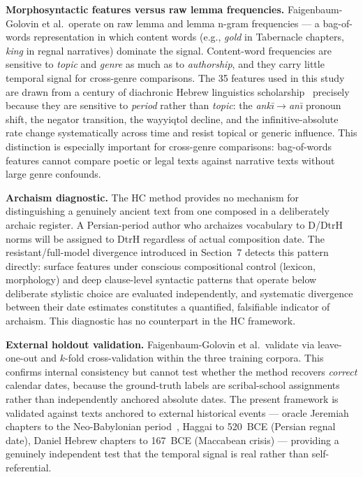 \documentclass[10pt,letterpaper]{article}
\begin{document}
\textbf{Morphosyntactic features versus raw lemma frequencies.}
Faigenbaum-Golovin et al.\ operate on raw lemma and lemma n-gram
frequencies --- a bag-of-words representation in which content words
(e.g., \textit{gold} in Tabernacle chapters, \textit{king} in regnal
narratives) dominate the signal.  Content-word frequencies are sensitive
to \emph{topic} and \emph{genre} as much as to \emph{authorship}, and
they carry little temporal signal for cross-genre comparisons.  The 35
features used in this study are drawn from a century of diachronic Hebrew
linguistics scholarship~\cite{Hurvitz1982,Polzin1976,Rooker1990,Young2008}
precisely because they are sensitive to \emph{period} rather than
\emph{topic}: the \textit{ank\={\i}}$\to$\textit{an\={\i}} pronoun shift,
the negator transition, the wayyiqtol decline, and the
infinitive-absolute rate change systematically across time and resist
topical or generic influence.  This distinction is especially important
for cross-genre comparisons: bag-of-words features cannot compare poetic
or legal texts against narrative texts without large genre confounds.

\textbf{Archaism diagnostic.}
The HC method provides no mechanism for distinguishing a genuinely ancient
text from one composed in a deliberately archaic register.  A Persian-period
author who archaizes vocabulary to D/DtrH norms will be assigned to
DtrH regardless of actual composition date.  The resistant/full-model
divergence introduced in Section~7 detects this pattern directly: surface
features under conscious compositional control (lexicon, morphology) and
deep clause-level syntactic patterns that operate below deliberate stylistic
choice are evaluated independently, and systematic divergence between their
date estimates constitutes a quantified, falsifiable indicator of archaism.
This diagnostic has no counterpart in the HC framework.

\textbf{External holdout validation.}
Faigenbaum-Golovin et al.\ validate via leave-one-out and $k$-fold
cross-validation within the three training corpora.  This confirms internal
consistency but cannot test whether the method recovers \emph{correct}
calendar dates, because the ground-truth labels are scribal-school
assignments rather than independently anchored absolute dates.  The present
framework is validated against texts anchored to external historical events
--- oracle Jeremiah chapters to the Neo-Babylonian
period~\cite{Hurvitz1999}, Haggai to 520~BCE (Persian regnal date),
Daniel Hebrew chapters to 167~BCE (Maccabean crisis) --- providing a
genuinely independent test that the temporal signal is real rather than
self-referential.
\end{document}
